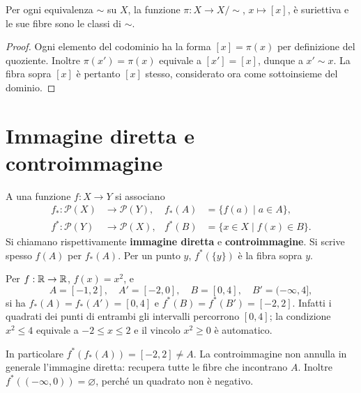 \begin{proposizione}
Per ogni equivalenza $\sim$ su $X$, la funzione $\pi:X\to X/{\sim}$, $x\mapsto[x]$, è suriettiva e le sue fibre sono le classi di $\sim$.
\end{proposizione}
\begin{proof}
Ogni elemento del codominio ha la forma $[x]=\pi(x)$ per definizione del quoziente. Inoltre $\pi(x')=\pi(x)$ equivale a $[x']=[x]$, dunque a $x'\sim x$. La fibra sopra $[x]$ è pertanto $[x]$ stesso, considerato ora come sottoinsieme del dominio.
\end{proof}

\section{Immagine diretta e controimmagine}
\begin{definizione}
A una funzione $f:X\to Y$ si associano
\[
\begin{aligned}
f_*:\mathcal P(X)&\to\mathcal P(Y),&f_*(A)&=\{f(a)\mid a\in A\},\\
f^*:\mathcal P(Y)&\to\mathcal P(X),&f^*(B)&=\{x\in X\mid f(x)\in B\}.
\end{aligned}
\]
Si chiamano rispettivamente \textbf{immagine diretta} e \textbf{controimmagine}. Si scrive spesso $f(A)$ per $f_*(A)$. Per un punto $y$, $f^*(\{y\})$ è la fibra sopra $y$.
\end{definizione}

\begin{esempio}[Il quadrato]
Per $f:\mathbb{R}\to\mathbb{R}$, $f(x)=x^2$, e
\[
A=[-1,2],\quad A'=[-2,0],\quad B=[0,4],\quad B'=(-\infty,4],
\]
si ha $f_*(A)=f_*(A')=[0,4]$ e $f^*(B)=f^*(B')=[-2,2]$. Infatti i quadrati dei punti di entrambi gli intervalli percorrono $[0,4]$; la condizione $x^2\le4$ equivale a $-2\le x\le2$ e il vincolo $x^2\ge0$ è automatico.

In particolare $f^*(f_*(A))=[-2,2]\ne A$. La controimmagine non annulla in generale l'immagine diretta: recupera tutte le fibre che incontrano $A$. Inoltre $f^*((-\infty,0))=\varnothing$, perché un quadrato non è negativo.
\end{esempio}

\begin{schema}
\end{schema}

